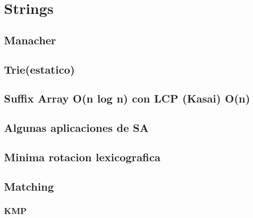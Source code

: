 

\section{Strings}%
\subsection{Manacher}

\subsection{Trie(estatico)}

\subsection{Suffix Array O(n log n) con LCP (Kasai) O(n)}

\subsection{Algunas aplicaciones de SA}

\subsection{Minima rotacion lexicografica}

\subsection{Matching}
\subsubsection{KMP}

